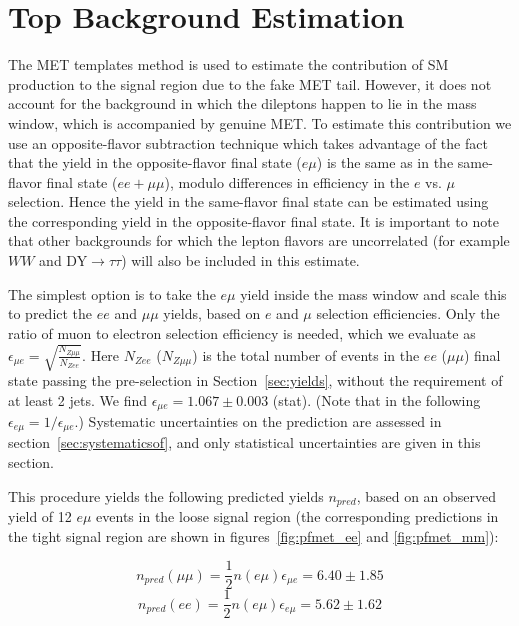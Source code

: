 


\section{Top Background Estimation}
\label{sec:topbkg}


The MET templates method is used to estimate the contribution of SM \Z production
 to the signal region due to the fake MET tail. However,
it does not account for the \ttbar background in which the dileptons happen to lie
 in the \Z mass window, which is accompanied by genuine MET. 
To estimate this contribution we use an opposite-flavor subtraction
technique which takes advantage of the fact that the \ttbar yield in the 
opposite-flavor final state ($e\mu$) is the same as in the same-flavor final state
($ee+\mu\mu$), modulo differences in efficiency in the $e$ vs. $\mu$ selection.
 Hence the \ttbar yield in the same-flavor final state can be estimated
using the corresponding yield in the opposite-flavor final state. 
It is important to note that other backgrounds for which the lepton flavors are
uncorrelated (for example $WW$ and DY$\rightarrow \tau\tau$) will also be included in
this estimate.

The simplest option
 is to take the $e\mu$ yield inside the \Z mass window and scale this
to predict the $ee$ and $\mu\mu$ yields, based on $e$ and $\mu$ selection efficiencies.
Only the ratio of muon to electron selection efficiency is needed, which we evaluate
 as $\epsilon_{\mu e} = \sqrt{\frac{N_{Z\mu\mu}}{N_{Zee}}}$. 
Here $N_{Zee}$ ($N_{Z\mu\mu}$) is the total number of events in the $ee$ ($\mu\mu$)
 final state passing the pre-selection in Section~\ref{sec:yields},
without the requirement of at least 2 jets. We find
 $\epsilon_{\mu e}=1.067 \pm 0.003$ (stat). %
(Note that in the following $\epsilon_{e\mu} = 1/\epsilon_{\mu e}$.)
Systematic uncertainties on the prediction are assessed in section~\ref{sec:systematicsof}, 
and only statistical uncertainties are given in this section.

This procedure yields the following predicted yields $n_{pred}$,
based on an observed yield of 12 $e\mu$ events %
in the loose signal region (the corresponding predictions in the tight 
signal region are shown in figures~\ref{fig:pfmet_ee} and \ref{fig:pfmet_mm}): 

\begin{equation}
n_{pred}(\mu\mu) = \frac{1}{2}n(e\mu)\epsilon_{\mu e} = 6.40 \pm 1.85 %
\end{equation}
\begin{equation}
n_{pred}(ee)     = \frac{1}{2}n(e\mu)\epsilon_{e\mu} = 5.62 \pm 1.62
\end{equation}

